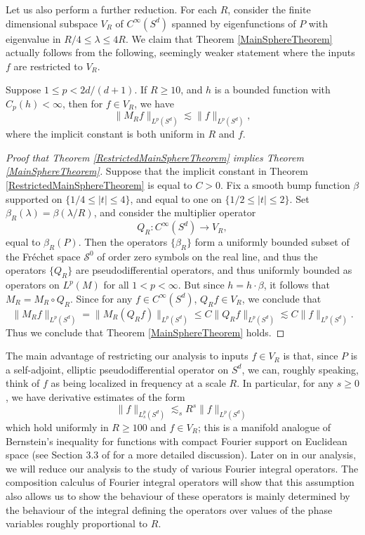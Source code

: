 Let us also perform a further reduction. For each $R$, consider the finite dimensional subspace $V_R$ of $C^\infty(S^d)$ spanned by eigenfunctions of $P$ with eigenvalue in $R/4 \leq \lambda \leq 4R$. We claim that Theorem \ref{MainSphereTheorem} actually follows from the following, seemingly weaker statement where the inputs $f$ are restricted to $V_R$.

\begin{theorem} \label{RestrictedMainSphereTheorem}
    Suppose $1 \leq p < 2d/(d+1)$. If $R \geq 10$, and $h$ is a bounded function with $C_p(h) < \infty$, then for $f \in V_R$, we have
    \[ \| M_R f \|_{L^p(S^d)} \lesssim \| f \|_{L^p(S^d)}, \]
    where the implicit constant is both uniform in $R$ and $f$.
\end{theorem}

\begin{proof}[Proof that Theorem \ref{RestrictedMainSphereTheorem} implies Theorem \ref{MainSphereTheorem}]
    Suppose that the implicit constant in Theorem \ref{RestrictedMainSphereTheorem} is equal to $C > 0$. Fix a smooth bump function $\beta$ supported on $\{ 1/4 \leq |t| \leq 4 \}$, and equal to one on $\{ 1/2 \leq |t| \leq 2 \}$. Set $\beta_R(\lambda) = \beta(\lambda / R)$, and consider the multiplier operator
    \[ Q_R: C^\infty(S^d) \to V_R, \]
    equal to $\beta_R( P )$. Then the operators $\{ \beta_R \}$ form a uniformly bounded subset of the Fr\'{e}chet space $\mathcal{S}^0$ of order zero symbols on the real line, and thus the operators $\{ Q_R \}$ are pseudodifferential operators, and thus uniformly bounded as operators on $L^p(M)$ for all $1 < p < \infty$. But since $h = h \cdot \beta$, it follows that $M_R = M_R \circ Q_R$. Since for any $f \in C^\infty(S^d)$, $Q_R f \in V_R$, we conclude that
    \[ \| M_R f \|_{L^p(S^d)} = \| M_R (Q_R f) \|_{L^p(S^d)} \leq C \| Q_R f \|_{L^p(S^d)} \lesssim C \| f \|_{L^p(S^d)}. \]
    Thus we conclude that Theorem \ref{MainSphereTheorem} holds.
\end{proof}

The main advantage of restricting our analysis to inputs $f \in V_R$ is that, since $P$ is a self-adjoint, elliptic pseudodifferential operator on $S^d$, we can, roughly speaking, think of $f$ as being localized in frequency at a scale $R$. In particular, for any $s \geq 0$, we have derivative estimates of the form
%
\begin{equation} \label{ManifoldBernsteinInequality}
    \| f \|_{L^p_s(S^d)} \lesssim_s R^s \| f \|_{L^p(S^d)}
\end{equation}
%
which hold uniformly in $R \geq 100$ and $f \in V_R$; this is a manifold analogue of Bernstein's inequality for functions with compact Fourier support on Euclidean space (see Section 3.3 of \cite{Sogge} for a more detailed discussion). Later on in our analysis, we will reduce our analysis to the study of various Fourier integral operators. The composition calculus of Fourier integral operators will show that this assumption also allows us to show the behaviour of these operators is mainly determined by the behaviour of the integral defining the operators over values of the phase variables roughly proportional to $R$.

